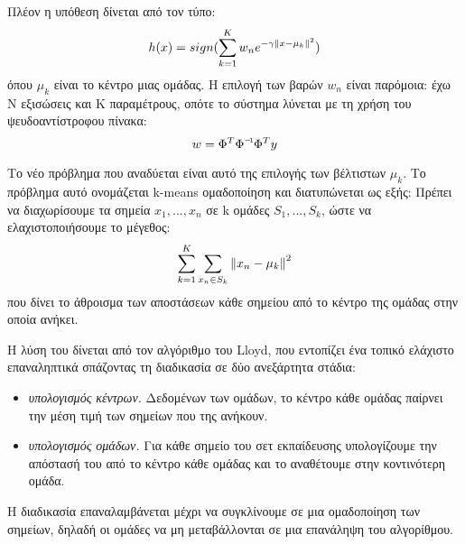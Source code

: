 Πλέον η υπόθεση δίνεται από τον τύπο:
$$h(x)= sign( \sum_{k=1}^{K} w_n e^{-\gamma \left\lVert x - \mu_k\right\rVert^2})$$
όπου $\mu_k$ είναι το κέντρο μιας ομάδας. Η επιλογή των βαρών $w_n$ είναι παρόμοια: έχω Ν εξισώσεις και Κ παραμέτρους, οπότε το σύστημα λύνεται με τη χρήση του ψευδοαντίστροφου πίνακα:
$$w= \inv{\Phi^T \Phi} \Phi^T y$$
	
	Το νέο πρόβλημα που αναδύεται είναι αυτό της επιλογής των βέλτιστων $\mu_k$. Το πρόβλημα αυτό ονομάζεται k-means ομαδοποίηση και διατυπώνεται ως εξής: Πρέπει να διαχωρίσουμε τα σημεία $x_1,..., x_n$ σε k ομάδες $S_1,...,S_k$, ώστε να ελαχιστοποιήσουμε το μέγεθος:
	$$\sum_{k=1}^{K} \sum_{x_n \in S_k} \left\lVert x_n - \mu_k\right\rVert^2$$
	που δίνει το άθροισμα των αποστάσεων κάθε σημείου από το κέντρο της ομάδας στην οποία ανήκει.
	
	Η λύση του δίνεται από τον αλγόριθμο του Lloyd, που εντοπίζει ένα τοπικό ελάχιστο επαναληπτικά σπάζοντας τη διαδικασία σε δύο ανεξάρτητα στάδια:
	\begin{itemize}
		\item \textit{υπολογισμός κέντρων.} Δεδομένων των ομάδων, το κέντρο κάθε ομάδας παίρνει την μέση τιμή των σημείων που της ανήκουν.
		\item \textit{υπολογισμός ομάδων.} Για κάθε σημείο του σετ εκπαίδευσης υπολογίζουμε την απόστασή του από το κέντρο κάθε ομάδας και το αναθέτουμε στην κοντινότερη ομάδα.
	\end{itemize}
	
	Η διαδικασία επαναλαμβάνεται μέχρι να συγκλίνουμε σε μια ομαδοποίηση των σημείων, δηλαδή οι ομάδες να μη μεταβάλλονται σε μια επανάληψη του αλγορίθμου.